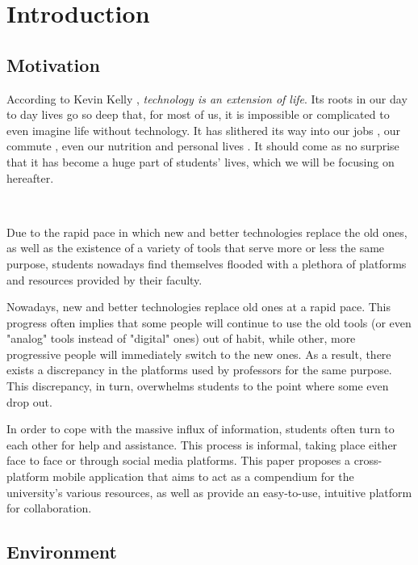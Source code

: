 \chapter{Introduction} \label{chapter1}

\section{Motivation} \label{1:motivation}

    According to Kevin Kelly \cite{kelly2010technology}, \textit{technology is an extension of life}. Its roots in our day to day lives go so deep that, for most of us, it is impossible or complicated to even imagine life without technology. It has slithered its way into our jobs \cite{lewis1996studying}, our commute \cite{kairi2019technology}, even our nutrition \cite{lewis2010role} and personal lives \cite{mcquillen2003influence}. It should come as no surprise that it has become a huge part of students' lives, which we will be focusing on hereafter.
    
    ~
    
    Due to the rapid pace in which new and better technologies replace the old ones, as well as the existence of a variety of tools that serve more or less the same purpose, students nowadays find themselves flooded with a plethora of platforms and resources provided by their faculty.
    
    Nowadays, new and better technologies replace old ones at a rapid pace. This progress often implies that some people will continue to use the old tools (or even "analog" tools instead of "digital" ones) out of habit, while other, more progressive people will immediately switch to the new ones. As a result, there exists a discrepancy in the platforms used by professors for the same purpose. This discrepancy, in turn, overwhelms students to the point where some even drop out.
    
    In order to cope with the massive influx of information, students often turn to each other for help and assistance. This process is informal, taking place either face to face or through social media platforms.
    \clearpage
    This paper proposes a cross-platform mobile application that aims to act as a compendium for the university's various resources, as well as provide an easy-to-use, intuitive platform for collaboration.

\section{Environment} \label{1:environment}

